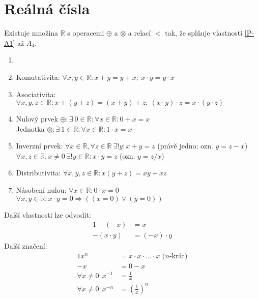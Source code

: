 \section{Reálná čísla}

\begin{theoremAlph}
	Existuje množina $\mathbb{R}$ s operacemi $\oplus$ a $\otimes$ a relací $<$ tak,
	že splňuje vlastnosti \ref{P-A1} až \textit{$A_4$}.	%
\end{theoremAlph}

\begin{property}\label{P-A1}
	\begin{enumerate}[I]
		\item[]
		\item Komutativita: $\forall x, y \in \mathbb{R}: x + y = y + x;~x\cdot y = y\cdot x$
		\item Asociativita: $\forall x, y, z \in \mathbb{R}: x + (y + z) = (x + y) + z;
			~(x\cdot y)\cdot z = x\cdot (y\cdot z)$
		\item Nulový prvek $\oplus: \exists~0 \in \mathbb{R}: \forall x \in \mathbb{R}: 0 + x = x$ \\
			Jednotka $\otimes: \exists~1 \in \mathbb{R}: \forall x \in \mathbb{R}: 1 \cdot x = x$
		\item Inverzní prvek: $\forall x \in \mathbb{R}, \forall z \in \mathbb{R}~\exists ! y:
			x + y = z$ (právě jedno; ozn. $y = z - x$) \\
			$\forall x, z \in \mathbb{R}, x\neq0 ~\exists ! y \in \mathbb{R}:
			x \cdot y = z$ (ozn. $y = z / x$)
		\item Distributivita: $\forall x, y, z \in \mathbb{R}: x (y + z) = xy + xz$
		\item Násobení nulou: $\forall x \in \mathbb{R}: 0\cdot x = 0$ \\
			$\forall x, y \in \mathbb{R}: x\cdot y = 0 \Rightarrow ((x = 0) \lor (y = 0))$
	\end{enumerate}
\end{property}
Další vlastnosti lze odvodit:
\begin{alignat}{1}
	-(-x) &= x \\
	-(x\cdot y) &= (-x)\cdot y
\end{alignat}
Další značení:
\begin{alignat}{1}
	x^n &= x\cdot x\cdot \text{...} \cdot x \text{~($n$-krát)} \\
	-x &= 0 - x \\
	\forall x \neq 0: x^{-1} &= \frac{1}{x} \\
	\forall x \neq 0: x^{-n} &= \left( \frac{1}{x} \right)^n
\end{alignat}

